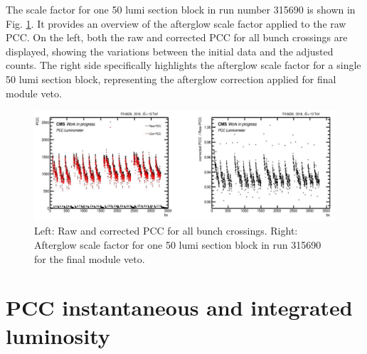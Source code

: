 The scale factor for one 50 lumi section block in run number 315690 is shown in Fig. \ref{fig:af_change_veto}. It provides an overview of the afterglow scale factor applied to the raw PCC. On the left, both the raw and corrected PCC for all bunch crossings are displayed, showing the variations between the initial data and the adjusted counts. The right side specifically highlights the afterglow scale factor for a single 50 lumi section block, representing the afterglow correction applied for final module veto.

\begin{figure}[!htp]
\centering
\includegraphics[width=1\textwidth]{ashish_thesis/afterglow_correction_factor_1lsblock_315690_1.png}
\caption[Run 315690 Afterglow Background]{%
 Left: Raw and corrected PCC for all bunch crossings. Right: Afterglow scale factor for one 50 lumi section block in run 315690 for the final module veto.
}
\label{fig:af_change_veto}
\end{figure}

\section{PCC instantaneous and integrated luminosity}

